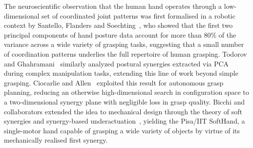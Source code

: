 \documentclass[letterpaper, 10 pt, conference]{ieeeconf}  %
\begin{document}
The neuroscientific observation that the human hand operates through a 
low-dimensional set of coordinated joint patterns was first formalised in 
a robotic context by Santello, Flanders and Soechting~\cite{c3}, who showed 
that the first two principal components of hand posture data account for 
more than 80\% of the variance across a wide variety of grasping tasks, 
suggesting that a small number of coordination patterns underlies the full 
repertoire of human grasping. Todorov and Ghahramani~\cite{c21} similarly analyzed postural synergies extracted via PCA during complex manipulation tasks, extending this line of work beyond simple grasping. Ciocarlie and Allen~\cite{c10} 
exploited this result for autonomous grasp planning, reducing an otherwise 
high-dimensional search in configuration space to a two-dimensional synergy 
plane with negligible loss in grasp quality. Bicchi and collaborators 
extended the idea to mechanical design through the theory of soft synergies 
and synergy-based underactuation~\cite{c11, c12}, yielding the Pisa/IIT SoftHand, 
a single-motor hand capable of grasping a wide variety of objects by virtue 
of its mechanically realised first synergy.
\end{document}
